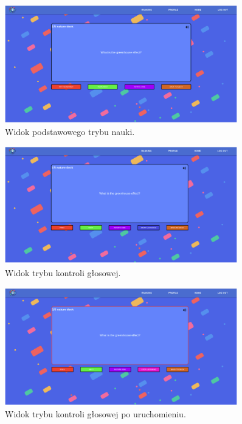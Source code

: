 \begin{figure}[H]
    \centering
    \includegraphics[width=0.9\textwidth]{chapters/chapter_10/images_web/web_learn}
    \caption{Widok podstawowego trybu nauki.}
    \label{img:web_learn}
\end{figure}


\begin{figure}[H]
    \centering
    \includegraphics[width=0.9\textwidth]{chapters/chapter_10/images_web/web_voice_1}
    \caption{Widok trybu kontroli głosowej.}
    \label{img:web_voice_1}
\end{figure}


\begin{figure}[H]
    \centering
    \includegraphics[width=0.9\textwidth]{chapters/chapter_10/images_web/web_voice_2}
    \caption{Widok trybu kontroli głosowej po uruchomieniu.}
    \label{img:web_voice_2}
\end{figure}


